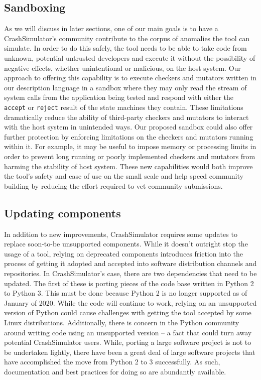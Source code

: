 \documentclass[twocolumn]{article}
\begin{document}
\subsection{Sandboxing}

As we will discuss in later sections, one of our main goals is to have a
CrashSimulator's community contribute to the corpus of anomalies the tool
can simulate.  In order to do this safely, the tool needs to be able to
take code from unknown, potential untrusted developers and execute it
without the possibility of negative effects, whether unintentional or
malicious, on the host system.  Our approach to offering this capability is
to execute checkers and mutators written in our description language in a
sandbox where they may only read the stream of system calls
from the application being tested and respond with either the {\tt accept} or
{\tt reject} result of the state machines they contain.  These limitations
dramatically reduce the ability of third-party checkers and mutators to
interact with the host system in unintended ways.
Our proposed sandbox could also offer further protection by enforcing
limitations on the checkers and mutators running within it.  For example,
it may be useful to impose memory or processing limits in order to prevent
long running or poorly implemented checkers and mutators from harming the
stability of host system.  These new capabilities would both improve the
tool's safety and ease of use on the small scale and help speed
community building by reducing the effort required to vet
community submissions.


\subsection{Updating components}

In addition to new improvements, CrashSimulator requires some updates to
replace soon-to-be unsupported components.  While it doesn't outright stop
the usage of a tool, relying on deprecated components introduces friction
into the process of getting it adopted and accepted into software
distribution channels and repositories.  In CrashSimulator's case, there
are two dependencies that need to be updated.  The first of these is
porting pieces of the code base written in Python 2 to Python 3.  This must
be done because Python 2 is no longer supported as of January of 2020.
While the code will continue to work, relying on an unsupported version of
Python could cause challenges with getting the tool accepted by some Linux
distributions.  Additionally, there is concern in the Python community
around writing code using an unsupported version -- a fact that could turn
away potential CrashSimulator users.  While, porting a large software
project is not to be undertaken lightly, there have been a great deal of
large software projects that have accomplished the move from Python 2 to 3
successfully.  As such, documentation and best practices for doing so are
abundantly available.
\end{document}
